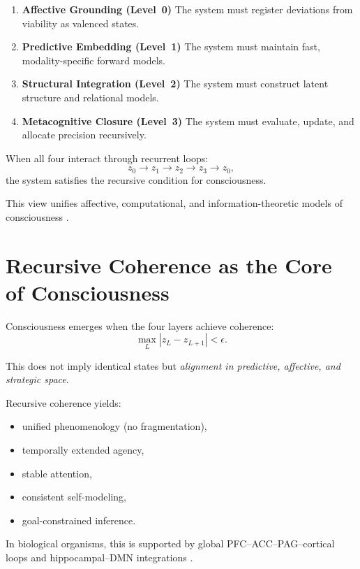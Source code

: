 \documentclass[12pt,oneside]{book}
\theoremstyle{plain}
\theoremstyle{definition}
\let\citep\parencite
\begin{document}
\begin{enumerate}
  \item \textbf{Affective Grounding (Level~0)}
  The system must register deviations from viability as valenced states.

  \item \textbf{Predictive Embedding (Level~1)}
  The system must maintain fast, modality-specific forward models.

  \item \textbf{Structural Integration (Level~2)}
  The system must construct latent structure and relational models.

  \item \textbf{Metacognitive Closure (Level~3)}
  The system must evaluate, update, and allocate precision recursively.
\end{enumerate}

When all four interact through recurrent loops:
\[
z_0 \rightarrow z_1 \rightarrow z_2 \rightarrow z_3 \rightarrow z_0,
\]
the system satisfies the recursive condition for consciousness.

This view unifies affective, computational, and information-theoretic models of
consciousness \citep{seth2016review,lagatta2024consciousness}.

\section{Recursive Coherence as the Core of Consciousness}

Consciousness emerges when the four layers achieve coherence:
\[
\max_L |z_L - z_{L+1}| < \epsilon.
\]

This does not imply identical states but \emph{alignment in predictive,
affective, and strategic space}.

Recursive coherence yields:

\begin{itemize}
  \item unified phenomenology (no fragmentation),
  \item temporally extended agency,
  \item stable attention,
  \item consistent self-modeling,
  \item goal-constrained inference.
\end{itemize}

In biological organisms, this is supported by global
PFC–ACC–PAG–cortical loops and hippocampal–DMN integrations
\citep{laureys2000brain,dehaene2017brain}.
\end{document}
